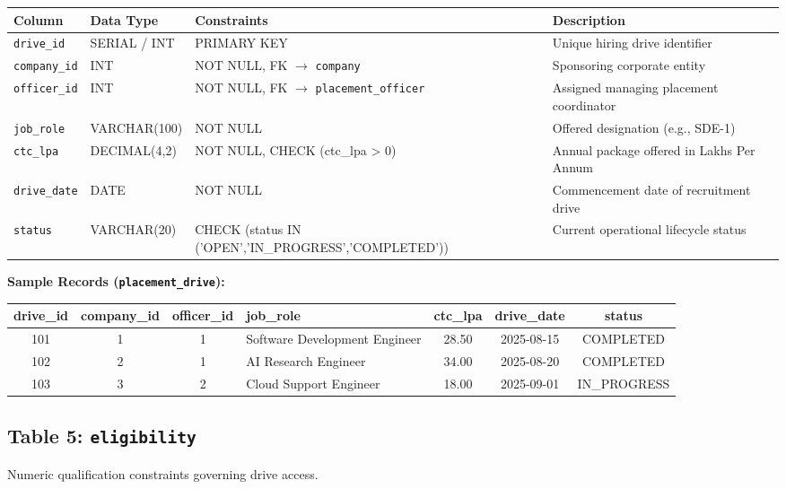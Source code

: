 \documentclass[11pt,a4paper]{article}
\begin{document}
\begin{table}[H]
    \centering
    \footnotesize
    \begin{tabularx}{\textwidth}{l l l X}
        \toprule
        \textbf{Column} & \textbf{Data Type} & \textbf{Constraints} & \textbf{Description} \\
        \midrule
        \texttt{drive\_id} & SERIAL / INT & PRIMARY KEY & Unique hiring drive identifier \\
        \texttt{company\_id} & INT & NOT NULL, FK \(\to\) \texttt{company} & Sponsoring corporate entity \\
        \texttt{officer\_id} & INT & NOT NULL, FK \(\to\) \texttt{placement\_officer} & Assigned managing placement coordinator \\
        \texttt{job\_role} & VARCHAR(100) & NOT NULL & Offered designation (e.g., SDE-1) \\
        \texttt{ctc\_lpa} & DECIMAL(4,2) & NOT NULL, CHECK (ctc\_lpa > 0) & Annual package offered in Lakhs Per Annum \\
        \texttt{drive\_date} & DATE & NOT NULL & Commencement date of recruitment drive \\
        \texttt{status} & VARCHAR(20) & CHECK (status IN ('OPEN','IN\_PROGRESS','COMPLETED')) & Current operational lifecycle status \\
        \bottomrule
    \end{tabularx}
\end{table}

\textbf{Sample Records (\texttt{placement\_drive}):}
\begin{table}[H]
    \centering
    \scriptsize
    \begin{tabularx}{\textwidth}{c c c l c c c}
        \toprule
        \textbf{drive\_id} & \textbf{company\_id} & \textbf{officer\_id} & \textbf{job\_role} & \textbf{ctc\_lpa} & \textbf{drive\_date} & \textbf{status} \\
        \midrule
        101 & 1 & 1 & Software Development Engineer & 28.50 & 2025-08-15 & COMPLETED \\
        102 & 2 & 1 & AI Research Engineer & 34.00 & 2025-08-20 & COMPLETED \\
        103 & 3 & 2 & Cloud Support Engineer & 18.00 & 2025-09-01 & IN\_PROGRESS \\
        \bottomrule
    \end{tabularx}
\end{table}

\subsection{Table 5: \texttt{eligibility}}
Numeric qualification constraints governing drive access.
\end{document}

